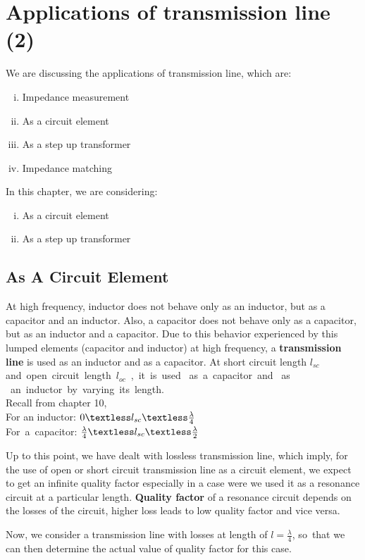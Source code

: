 \chapter{Applications of transmission line (2)}\label{lec:lec11}
We are discussing the applications of transmission line, which are:
\begin{enumerate}[(i)]
\item Impedance measurement
\item As a circuit element
\item As a step up transformer
\item Impedance matching 
\end{enumerate}

In this chapter, we are considering:
\begin{enumerate}[(i)]
\item As a circuit element
\item As a step up transformer
\end{enumerate}

\section{As A Circuit Element}
At high frequency, inductor does not behave only as an inductor, but as a capacitor and an inductor. Also, a capacitor does not behave only as a capacitor, but as an inductor and a capacitor. Due to this behavior experienced by this lumped elements (capacitor and inductor) at high frequency, a \textbf{transmission line} is used as an inductor and as a capacitor.
At short circuit length $l_{sc}$ and\ open\ circuit\ length\ $l_{oc}$\ ,\ it\ is\ used \ as\ a\ capacitor\ and \ as \ an\ inductor\ by\ varying\ its\ length.\\
Recall from chapter 10,\\
For an inductor: $0 \textless l_{sc} \textless 
\frac{\lambda}{4}$\\
For\ a\ capacitor: $\frac{\lambda}{4} \textless l_{sc} \textless \frac{\lambda}{2} $


Up to this point, we have dealt with lossless transmission line, which imply, for the use of open or short circuit transmission line as a circuit element, we expect to get an infinite quality factor especially in a case were we used it as a resonance circuit at a particular length. \textbf{Quality factor} of a resonance circuit depends on the losses of the circuit, higher loss leads to low quality factor and vice versa.

Now, we consider a transmission line with losses at length of $ l=\frac{\lambda}{4} $, so\ that we can then determine the actual value of quality factor for this case.\\

